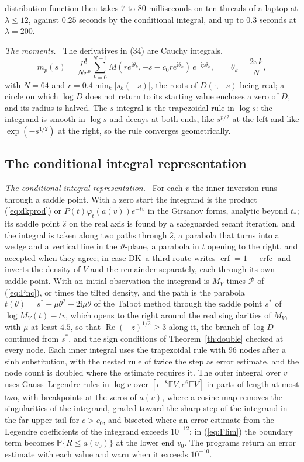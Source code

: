\documentclass[ecta,nameyear,final,supplement]{econsocart}
\newcommand{\E}{{\mathbb E}}
\newcommand{\PP}{{\mathbb P}}
\newcommand{\iu}{{\mathrm i}}
\newcommand{\Rea}{\operatorname{Re}}
\newcommand{\erf}{\operatorname{erf}}
\newcommand{\erfc}{\operatorname{erfc}}
\newcommand{\Fk}{\textsf{\upshape DK}}
\newcommand{\cP}{\mathcal{P}}
\theoremstyle{plain}
\theoremstyle{definition}
\newcommand{\runin}[1]{\par\medskip\noindent\textit{#1.}\ \ignorespaces}
\begin{document}
distribution function then takes $7$ to $80$ milliseconds on ten threads of a laptop at $\lambda\le12$, against $0.25$ seconds by the conditional integral, and up to $0.3$ seconds at $\lambda=200$.

\runin{The moments}  The derivatives in (34) are Cauchy integrals,
\[
m_p(s)=\frac{p!}{Nr^p}\sum_{k=0}^{N-1}M(re^{\iu\theta_k},-s-c_0re^{\iu\theta_k})\,e^{-\iu p\theta_k},\qquad\theta_k=\frac{2\pi k}{N},
\]
with $N=64$ and $r=0.4\min_k|s_k(-s)|$, the roots of $D(\cdot,-s)$ being real; a circle on which $\log D$ does not return to its starting value encloses a zero of $D$, and its radius is halved.  The $s$-integral is the trapezoidal rule in $\log s$: the integrand is smooth in $\log s$ and decays at both ends, like $s^{p/2}$ at the left and like $\exp(-s^{1/2})$ at the right, so the rule converges geometrically.

\subsection{The conditional integral representation}
\label{app:double}

\runin{The conditional integral representation}  For each $v$ the inner inversion runs through a saddle point.  With a zero start the integrand is the product (\ref{eq:dkprod}) or $P(t)\varphi_t(a(v))e^{-tv}$ in the Girsanov forms, analytic beyond $t_*$; its saddle point $\hat s$ on the real axis is found by a safeguarded secant iteration, and the integral is taken along two paths through $\hat s$, a parabola that turns into a wedge and a vertical line in the $\vartheta$-plane, a parabola in $t$ opening to the right, and accepted when they agree; in case \Fk\ a third route writes $\erf=1-\erfc$ and inverts the density of $V$ and the remainder separately, each through its own saddle point.  With an initial observation the integrand is $M_V$ times $\cP$ of (\ref{eq:Pnc}), or times the tilted density, and the path is the parabola $t(\theta)=s^*+\mu\theta^2-2\iu\mu\theta$ of the Talbot method \citep{WeidemanTrefethen2007} through the saddle point $s^*$ of $\log M_V(t)-tv$, which opens to the right around the real singularities of $M_V$, with $\mu$ at least $4.5$, so that $\Rea(-z)^{1/2}\ge3$ along it, the branch of $\log D$ continued from $s^*$, and the sign conditions of Theorem~\ref{th:double} checked at every node.  Each inner integral uses the trapezoidal rule with $96$ nodes after a sinh substitution, with the nested rule of twice the step as error estimate, and the node count is doubled where the estimate requires it.  The outer integral over $v$ uses Gauss--Legendre rules in $\log v$ over $[e^{-8}\E V,e^6\E V]$ in parts of length at most two, with breakpoints at the zeros of $a(v)$, where a cosine map removes the singularities of the integrand, graded toward the sharp step of the integrand in the far upper tail for $c>c_0$, and bisected where an error estimate from the Legendre coefficients of the integrand exceeds $10^{-12}$; in (\ref{eq:Flim}) the boundary term becomes $\PP\{R\le a(v_0)\}$ at the lower end $v_0$.  The programs return an error estimate with each value and warn when it exceeds $10^{-10}$.
\end{document}
